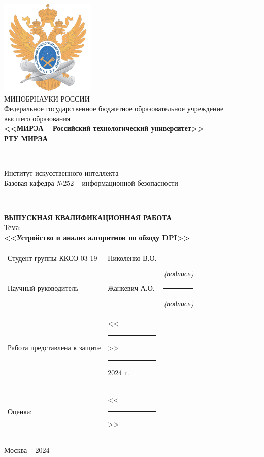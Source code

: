 \documentclass[utf8,14pt,a4paper,oneside,russian]{book}
\begin{document}
\thispagestyle{empty}
\small
\begin{center}
    \includegraphics[width=4.55cm]{logo_mirea}\\
    \MakeUppercase{Минобрнауки России}\\[1em]
    Федеральное государственное бюджетное образовательное учреждение\\
    высшего образования\\[0.5em]
    \textbf{<<МИРЭА -- Российский технологический университет>>}\\
    \textbf{РТУ МИРЭА}\\
    \rule{\textwidth}{0.75pt}\\
    Институт искусственного интеллекта\\
    Базовая кафедра №252 -- информационной безопасности\\[-0.45em]
    \rule{\textwidth}{0.75pt}\\[5em]
    \normalsize\MakeUppercase{\textbf{Выпускная Квалификационная Работа}}\small\\[0.5em]
    Тема:\\ \textbf{<<Устройство и анализ алгоритмов по обходу DPI>>} \\[3em]
    \begin{tabular}{p{7cm}p{6cm}c}
        Студент группы ККСО-03-19    & Николенко В.О.                                      & \rule{2cm}{0.75pt}                    \\[-0.5em]
                                     &                                                     & \footnotesize\textit{(подпись)}\small \\[1em]
        Научный руководитель         & Жанкевич А.О.                                       & \rule{2cm}{0.75pt}                    \\[-0.5em]
                                     &                                                     & \footnotesize\textit{(подпись)}\small \\[5em]
        Работа представлена к защите & <<\rule{0.5cm}{0.75pt}>> \rule{2cm}{0.75pt} 2024 г. &                                       \\[1em]
        Оценка:                      & <<\rule{0.5cm}{0.75pt}>>                            &                                       \\[1em]
    \end{tabular}
    \vfill
    Москва -- 2024
\end{center}
\normalsize
\newpage
\end{document}
